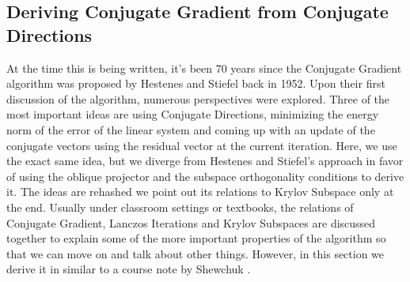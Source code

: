 \documentclass[]{article}
\theoremstyle{definition}
\begin{document}
    \subsection{Deriving Conjugate Gradient from Conjugate Directions}
        At the time this is being written, it's been 70 years since the Conjugate Gradient algorithm was proposed by Hestenes and Stiefel back in 1952\cite{paper:cg_original}. Upon their first discussion of the algorithm, numerous perspectives were explored. Three of the most important ideas are using Conjugate Directions, minimizing the energy norm of the error of the linear system and coming up with an update of the conjugate vectors using the residual vector at the current iteration. Here, we use the exact same idea, but we diverge from Hestenes and Stiefel's approach in favor of using the oblique projector and the subspace orthogonality conditions to derive it. The ideas are rehashed we point out its relations to Krylov Subspace only at the end. Usually under classroom settings or textbooks, the relations of Conjugate Gradient, Lanczos Iterations and Krylov Subspaces are discussed together to explain some of the more important properties of the algorithm so that we can move on and talk about other things. However, in this section we derive it in similar to a course note by Shewchuk \cite{notes:painless_cg}. 
\end{document}
